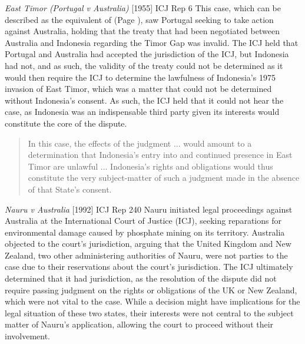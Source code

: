 \begin{casedetails}{\textit{East Timor (Portugal v Australia)} [1955] ICJ Rep 6}
    \flushleft
    This case, which can be described as the equivalent of  (Page \pageref{case:Horta v Commonwealth}), saw Portugal seeking to take action against Australia, holding that the treaty that had been negotiated between Australia and Indonesia regarding the Timor Gap was invalid. The ICJ held that Portugal and Australia had accepted the jurisdiction of the ICJ, but Indonesia had not, and as such, the validity of the treaty could not be determined as it would then require the ICJ to determine the lawfulness of Indonesia's 1975 invasion of East Timor, which was a matter that could not be determined without Indonesia's consent. As such, the ICJ held that it could not hear the case, as Indonesia was an indispensable third party given its interests would constitute the core of the dispute.

    \begin{quote}
        In this case, the effects of the judgment ... would amount to a determination that Indonesia's entry into and continued presence in East Timor are unlawful ... Indonesia's rights and obligations would thus constitute the very subject-matter of such a judgment made in the absence of that State's consent.
    \end{quote}
\end{casedetails}

\begin{casedetails}{\textit{Nauru v Australia} [1992] ICJ Rep 240}
    \flushleft
    Nauru initiated legal proceedings against Australia at the International Court of Justice (ICJ), seeking reparations for environmental damage caused by phosphate mining on its territory. Australia objected to the court's jurisdiction, arguing that the United Kingdom and New Zealand, two other administering authorities of Nauru, were not parties to the case due to their reservations about the court's jurisdiction. The ICJ ultimately determined that it had jurisdiction, as the resolution of the dispute did not require passing judgment on the rights or obligations of the UK or New Zealand, which were not vital to the case. While a decision might have implications for the legal situation of these two states, their interests were not central to the subject matter of Nauru's application, allowing the court to proceed without their involvement.
\end{casedetails}

